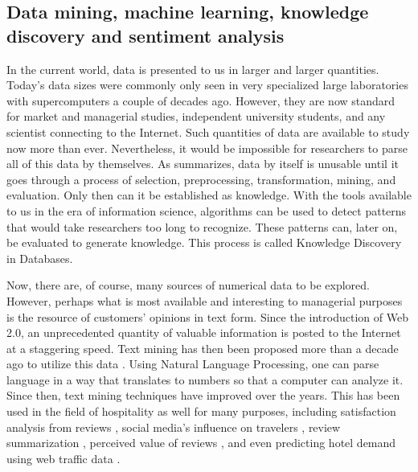 \documentclass[smallextended,natbib]{svjour3}       %
\begin{document}
  \subsection{Data mining, machine learning, knowledge discovery and sentiment analysis}\label{theory_data}

    In the current world, data is presented to us in larger and larger quantities. Today's data sizes were commonly only seen in very specialized large laboratories with supercomputers a couple of decades ago. However, they are now standard for market and managerial studies, independent university students, and any scientist connecting to the Internet. Such quantities of data are available to study now more than ever. Nevertheless, it would be impossible for researchers to parse all of this data by themselves. As \cite{fayyad1996data} summarizes, data by itself is unusable until it goes through a process of selection, preprocessing, transformation, mining, and evaluation. Only then can it be established as knowledge. With the tools available to us in the era of information science, algorithms can be used to detect patterns that would take researchers too long to recognize. These patterns can, later on, be evaluated to generate knowledge. This process is called Knowledge Discovery in Databases. 

    Now, there are, of course, many sources of numerical data to be explored.  However, perhaps what is most available and interesting to managerial purposes is the resource of customers' opinions in text form. Since the introduction of Web 2.0, an unprecedented quantity of valuable information is posted to the Internet at a staggering speed. Text mining has then been proposed more than a decade ago to utilize this data \cite[e.g.][]{rajman1998text,nahm2002text}. Using Natural Language Processing, one can parse language in a way that translates to numbers so that a computer can analyze it. Since then, text mining techniques have improved over the years. This has been used in the field of hospitality as well for many purposes, including satisfaction analysis from reviews \cite[e.g][]{berezina2016, xu2016, xiang2015, hargreaves2015, balbi2018}, social media's influence on travelers \cite[e.g.][]{xiang2010}, review summarization \cite[e.g.][]{hu2017436}, perceived value of reviews \cite[e.g][]{FANG2016498}, and even predicting hotel demand using web traffic data \cite[e.g][]{yang2014}.
\end{document}
